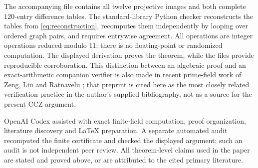 \documentclass[11pt]{article}
\begin{document}
The accompanying file  contains
all twelve projective images and both complete $120$-entry difference
tables.  The standard-library Python checker
 reconstructs the tables from
\eqref{eq:reconstruction}, recomputes them independently by looping over
ordered graph pairs, and requires entrywise agreement.  All operations are
integer operations reduced modulo $11$; there is no floating-point or
randomized computation.  The displayed derivation proves the theorem, while
the files provide reproducible corroboration.  This distinction between an
algebraic proof and an exact-arithmetic companion verifier is also made in
recent prime-field work of Zeng, Liu and Ratnavelu
\cite{ZengLiuRatnavelu2026}; that preprint is cited here as the most closely
related verification practice in the author's supplied bibliography, not
as a source for the present CCZ argument.

OpenAI Codex assisted with exact finite-field computation, proof
organization, literature discovery and LaTeX preparation.  A separate
automated audit recomputed the finite certificate and checked the displayed
argument; such an audit is not independent peer review.  All theorem-level
claims used in the paper are stated and proved above, or are attributed to
the cited primary literature.



\end{document}
